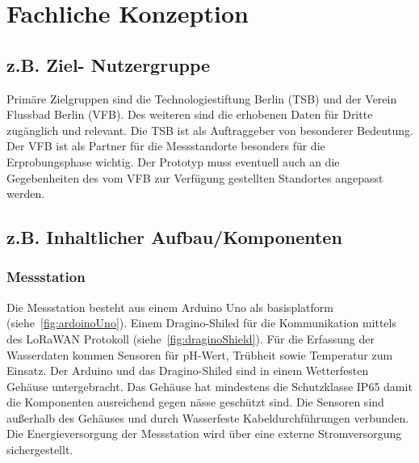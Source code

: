 \section{Fachliche Konzeption}


\subsection{z.B. Ziel- Nutzergruppe}

Primäre Zielgruppen sind die Technologiestiftung Berlin (TSB) und der Verein Flussbad Berlin (VFB). Des weiteren sind die erhobenen Daten für Dritte zugänglich und relevant. Die TSB ist als Auftraggeber von besonderer Bedeutung. Der VFB ist als Partner für die Messstandorte besonders für die Erprobungsphase wichtig. Der Prototyp muss eventuell auch an die Gegebenheiten des vom VFB zur Verfügung gestellten Standortes angepasst werden.

\subsection{z.B. Inhaltlicher Aufbau/Komponenten}\label{subsec:con_strct_comp}


\subsubsection{Messstation}
Die Messstation besteht aus einem Arduino Uno als basisplatform (siehe~\autoref{fig:ardoinoUno}). Einem Dragino-Shiled für die Kommunikation mittels des LoRaWAN Protokoll (siehe~\autoref{fig:draginoShield}). Für die Erfassung der Wasserdaten kommen Sensoren für pH-Wert, Trübheit sowie Temperatur zum Einsatz. Der Arduino und das Dragino-Shiled sind in einem Wetterfesten Gehäuse untergebracht. Das Gehäuse hat mindestens die Schutzklasse IP65 damit die Komponenten ausreichend gegen nässe geschützt sind. Die Sensoren sind außerhalb des Gehäuses und durch Wasserfeste Kabeldurchführungen verbunden. Die Energieversorgung der Messstation wird über eine externe Stromversorgung sichergestellt.

